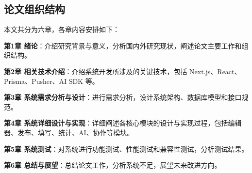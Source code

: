 \subsection{论文组织结构}

本文共分为六章，各章内容安排如下：

\textbf{第1章 绪论}：介绍研究背景与意义，分析国内外研究现状，阐述论文主要工作和组织结构。

\textbf{第2章 相关技术介绍}：介绍系统开发所涉及的关键技术，包括 Next.js、React、Prisma、Pusher、AI SDK 等。

\textbf{第3章 系统需求分析与设计}：进行需求分析，设计系统架构、数据库模型和接口规范。

\textbf{第4章 系统详细设计与实现}：详细阐述各核心模块的设计与实现过程，包括编辑器、发布、填写、统计、AI、协作等模块。

\textbf{第5章 系统测试}：对系统进行功能测试、性能测试和兼容性测试，分析测试结果。

\textbf{第6章 总结与展望}：总结论文工作，分析系统不足，展望未来改进方向。
